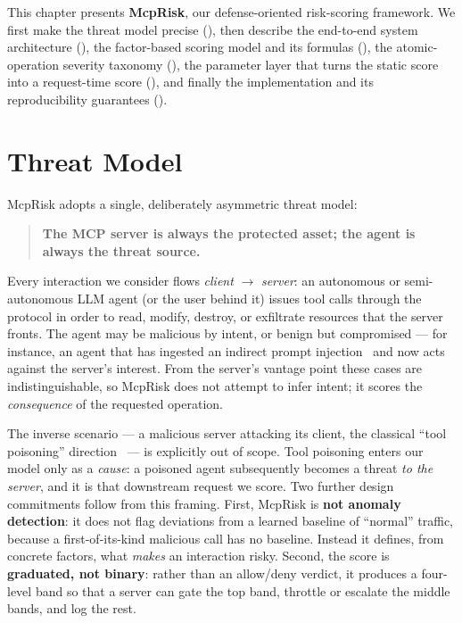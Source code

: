 This chapter presents \textbf{McpRisk}, our defense-oriented risk-scoring
framework. We first make the threat model precise
(), then describe the end-to-end system
architecture (), the factor-based scoring
model and its formulas (), the atomic-operation
severity taxonomy (), the parameter layer that turns
the static score into a request-time score (), and
finally the implementation and its reproducibility guarantees
().

\section{Threat Model}
\label{sec:framework:threat_model}

McpRisk adopts a single, deliberately asymmetric threat model:

\begin{quote}
\textbf{The MCP server is always the protected asset; the agent is always the
threat source.}
\end{quote}

Every interaction we consider flows \emph{client} $\to$ \emph{server}: an
autonomous or semi-autonomous LLM agent (or the user behind it) issues tool
calls through the protocol in order to read, modify, destroy, or exfiltrate
resources that the server fronts. The agent may be malicious by intent, or
benign but compromised --- for instance, an agent that has ingested an indirect
prompt injection~\cite{zhan2024injecagent} and now acts against the server's
interest. From the server's vantage point these cases are indistinguishable,
so McpRisk does not attempt to infer intent; it scores the \emph{consequence}
of the requested operation.

The inverse scenario --- a malicious server attacking its client, the classical
``tool poisoning'' direction~\cite{shi2025toolhijacker} --- is explicitly out
of scope. Tool poisoning enters our model only as a \emph{cause}: a poisoned
agent subsequently becomes a threat \emph{to the server}, and it is that
downstream request we score. Two further design commitments follow from this
framing. First, McpRisk is \textbf{not anomaly detection}: it does not flag
deviations from a learned baseline of ``normal'' traffic, because a
first-of-its-kind malicious call has no baseline. Instead it defines, from
concrete factors, what \emph{makes} an interaction risky. Second, the score is
\textbf{graduated, not binary}: rather than an allow/deny verdict, it produces a
four-level band so that a server can gate the top band, throttle or escalate the
middle bands, and log the rest.

